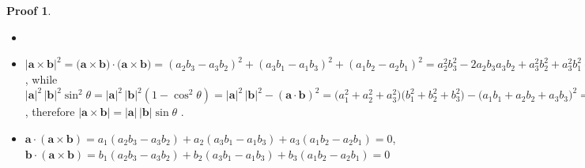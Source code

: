 \documentclass[12pt]{extarticle}
\newcommand{\ds}{\displaystyle}
\theoremstyle{definition}
\newtheorem*{prf}{Proof}
\newcommand{\va}{\mathbf{a}}
\newcommand{\vb}{\mathbf{b}}
\begin{document}
\begin{prf}
  \begin{itemize}
    \item[]
    \item $\ds|\va\times\vb|^2 =\big(\va\times\vb\big)\cdot\big(\va\times\vb\big) = (a_2b_3-a_3b_2)^2 + (a_3b_1-a_1b_3)^2 + (a_1b_2-a_2b_1)^2 = a_2^2b_3^2-2a_2b_3a_3b_2+a_3^2b_2^2 +a_3^2b_1^2-2a_3b_1a_1b_3+a_1^2b_3^2 + a_1^2b_2^2-2a_1b_2a_2b_1+a_2^2b_1^2$, while $\ds|\va|^2\,|\vb|^2\sin^2\theta = |\va|^2\,|\vb|^2(1 - \cos^2\theta) = |\va|^2\,|\vb|^2 - (\va\cdot\vb)^2 = \big(a_1^2+a_2^2+a_3^2\big)\big(b_1^2+b_2^2+b_3^2\big)-\big(a_1b_1+a_2b_2+a_3b_3\big)^2 = a_1^2b_2^2+a_1^2b_3^2+a_2^2b_1^2+a_2^2b_3^2+a_3^2b_1^2+a_3^2b_2^2 - \big(2a_1b_1a_2b_2+2a_1b_1a_3b_3+2a_2b_2a_3b_3\big)$, therefore $|\va\times\vb|=|\va|\,|\vb|\sin\theta$ . 
    \item $\ds\va\cdot(\va\times\vb) = a_1(a_2 b_3 - a_3 b_2) + a_2(a_3 b_1 - a_1 b_3) + a_3(a_1 b_2 - a_2 b_1) = 0$, \\$\ds\vb\cdot(\va\times\vb) = b_1(a_2 b_3 - a_3 b_2) + b_2(a_3 b_1 - a_1 b_3) + b_3(a_1 b_2 - a_2 b_1) = 0$

\end{itemize}
\end{prf}
\end{document}
